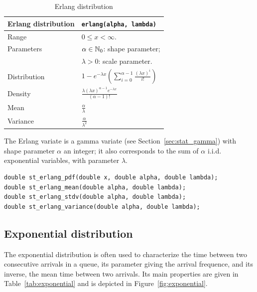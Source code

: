\begin{table}[htb]
\begin{tabularx}{\textwidth}{ll}
Erlang distribution & \verb|erlang(alpha, lambda)| \\
\hline
Range & $0 \leq x < \infty$.\\
Parameters & $\alpha \in \mathbb{N}_0$: shape parameter; \\
& $\lambda > 0$: scale parameter. \\
Distribution & 
$1 - e^{-\lambda x} \left( \sum_{i = 0}^{\alpha-1} \frac{(\lambda x)^i}{i!} \right)$
\\
Density & $\frac{\lambda (\lambda x)^{\alpha-1} e^{-\lambda x}}{(\alpha-1)!}$ \\
Mean & $\frac{\alpha}{\lambda}$ \\
Variance & $\frac{\alpha}{\lambda^2}$ \\
\hline
\end{tabularx}
\caption{Erlang distribution}
\end{table}

The Erlang variate is a gamma variate (see
Section~\ref{sec:stat_gamma}) with shape parameter $\alpha$ an
integer; it also corresponds to the sum of $\alpha$ i.i.d. exponential
variables, with parameter $\lambda$.

\begin{verbatim}
double st_erlang_pdf(double x, double alpha, double lambda);
double st_erlang_mean(double alpha, double lambda);
double st_erlang_stdv(double alpha, double lambda);
double st_erlang_variance(double alpha, double lambda);
\end{verbatim}

\subsection{Exponential distribution}
\label{sec:stat_exponential}

The exponential distribution is often used to characterize the time between
two consecutive arrivals in a queue, its parameter giving the arrival
frequence, and its inverse, the mean time between two arrivals.
Its main properties are given in Table~\ref{tab:exponential} and is depicted in Figure~\ref{fig:exponential}.

